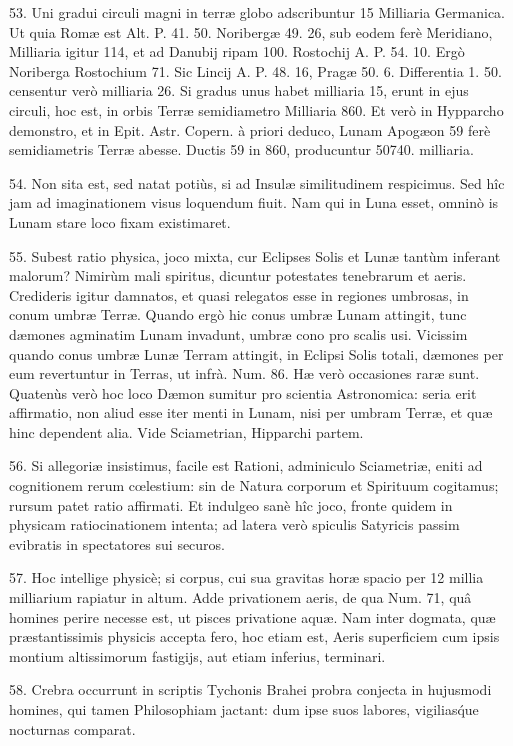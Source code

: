 \documentclass[a4paper, 11pt, oneside, polutonikogreek, german]{article}
\begin{document}
53. Uni gradui circuli magni in terræ globo adscribuntur 15 Milliaria Germanica. Ut quia Romæ est Alt. P. 41. 50. Noribergæ 49. 26, sub eodem ferè Meridiano, Milliaria igitur 114, et ad Danubij ripam 100. Rostochij A. P. 54. 10. Ergò Noriberga Rostochium 71. Sic Lincij A. P. 48. 16, Pragæ 50. 6. Differentia 1. 50. censentur verò milliaria 26. Si gradus unus habet milliaria 15, erunt in ejus circuli, hoc est, in orbis Terræ semidiametro Milliaria 860. Et verò in Hypparcho demonstro, et in Epit. Astr. Copern. à priori deduco, Lunam Apogæon 59 ferè semidiametris Terræ abesse. Ductis 59 in 860, producuntur 50740. milliaria.

54. Non sita est, sed natat potiùs, si ad Insulæ similitudinem respicimus. Sed hîc jam ad imaginationem visus loquendum fiuit. Nam qui in Luna esset, omninò is Lunam stare loco fixam existimaret.

55. Subest ratio physica, joco mixta, cur Eclipses Solis et Lunæ tantùm inferant malorum? Nimirùm mali spiritus, dicuntur potestates tenebrarum et aeris. Credideris igitur damnatos, et quasi relegatos esse in regiones umbrosas, in conum umbræ Terræ. Quando ergò hic conus umbræ Lunam attingit, tunc dæmones agminatim Lunam invadunt, umbræ cono pro scalis usi. Vicissim quando conus umbræ Lunæ Terram attingit, in Eclipsi Solis totali, dæmones per eum revertuntur in Terras, ut infrà. Num. 86. Hæ verò occasiones raræ sunt. Quatenùs verò hoc loco Dæmon sumitur pro scientia Astronomica: seria erit affirmatio, non aliud esse iter menti in Lunam, nisi per umbram Terræ, et quæ hinc dependent alia. Vide Sciametrian, Hipparchi partem.

56. Si allegoriæ insistimus, facile est Rationi, adminiculo Sciametriæ, eniti ad cognitionem rerum cœlestium: sin de Natura corporum et Spirituum cogitamus; rursum patet ratio affirmati. Et indulgeo sanè hîc joco, fronte quidem in physicam ratiocinationem intenta; ad latera verò spiculis Satyricis passim evibratis in spectatores sui securos.

57. Hoc intellige physicè; si corpus, cui sua gravitas horæ spacio per 12 millia milliarium rapiatur in altum. Adde privationem aeris, de qua Num. 71, quâ homines perire necesse est, ut pisces privatione aquæ. Nam inter dogmata, quæ præstantissimis physicis accepta fero, hoc etiam est, Aeris superficiem cum ipsis montium altissimorum fastigijs, aut etiam inferius, terminari.

58. Crebra occurrunt in scriptis Tychonis Brahei probra conjecta in hujusmodi homines, qui tamen Philosophiam jactant: dum ipse suos labores, vigilias\'que nocturnas comparat.
\end{document}

